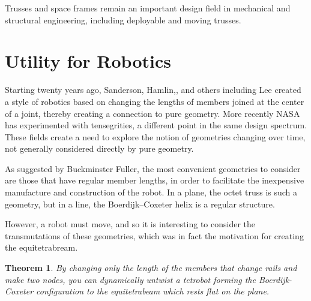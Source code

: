 \documentclass[11pt]{article}
\newtheorem{theorem}{Theorem}
\begin{document}
Trusses and space frames remain an important design field in
mechanical and structural engineering\cite{mikulas1985sequentially},
including deployable and moving trusses\cite{claypool2012readily}.


\section{Utility for Robotics}

Starting twenty years ago, Sanderson\cite{sanderson1996modular},
Hamlin,\cite{TetrobotBook}, and others including
Lee\cite{lee2002dynamic} created a style of robotics based on changing
the lengths of members joined at the center of a joint, thereby
creating a connection to pure geometry. More recently NASA has
experimented with tensegrities\cite{NTRT}, a different point in the
same design spectrum. These fields create a need to explore the notion
of geometries changing over time, not generally considered directly by
pure geometry.

As suggested by Buckminster Fuller, the most convenient geometries to
consider are those that have regular member lengths, in order to
facilitate the inexpensive manufacture and construction of the robot.
In a plane, the octet truss\cite{richard1961synergetic} is such a geometry, but in a line, the
Boerdijk--Coxeter helix is a regular structure.

However, a robot must move, and so it is interesting to consider the
transmutations of these geometries, which was in fact the motivation
for creating the equitetrabream.

\begin{theorem}
  By changing only the length of the members that change rails and make two nodes, you can dynamically untwist a tetrobot
  forming the Boerdijk-Coxeter configuration to the equitetrabeam which rests flat on the plane.
\end{theorem}
\end{document}
